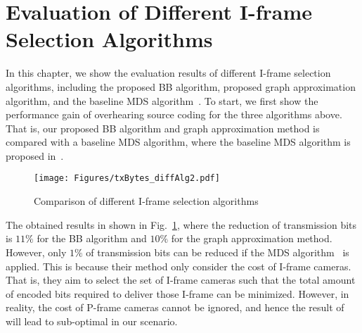 \section{Evaluation of Different I-frame Selection Algorithms}
In this chapter, we show the evaluation results of different I-frame selection algorithms, including the proposed BB algorithm, proposed graph approximation algorithm, and the baseline MDS algorithm~\cite{MWDS_baseline}.
To start, we first show the performance gain of overhearing source coding for the three algorithms above.
That is, our proposed BB algorithm and graph approximation method is compared with a baseline MDS algorithm, where the baseline MDS algorithm is proposed in~\cite{MWDS_baseline}.
%
\begin{figure}
\begin{center}
\texttt{[image: Figures/txBytes\_diffAlg2.pdf]}
\caption{\label{fig::txBytes_diffAlg} Comparison of different I-frame selection algorithms}
\end{center}
\end{figure}
%
The obtained results in shown in Fig.~\ref{fig::txBytes_diffAlg}, where the reduction of transmission bits is $11\%$ for the BB algorithm and $10\%$ for the graph approximation method.
However, only $1\%$ of transmission bits can be reduced if the MDS algorithm~\cite{MWDS_baseline} is applied.
This is because their method only consider the cost of I-frame cameras.
That is, they aim to select the set of I-frame cameras such that the total amount of encoded bits required to deliver those I-frame can be minimized.
However, in reality, the cost of P-frame cameras cannot be ignored, and hence the result of~\cite{MWDS_baseline} will lead to sub-optimal in our scenario.

